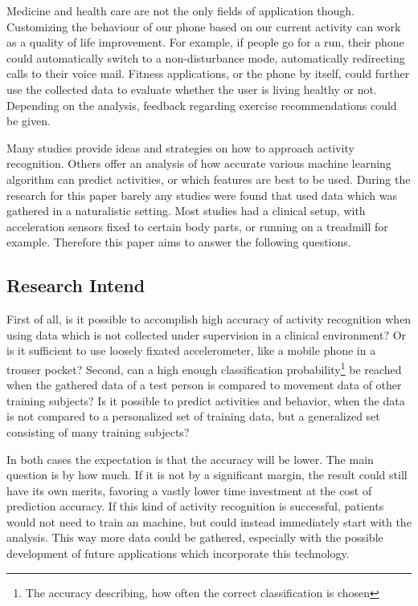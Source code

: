 Medicine and health care are not the only fields of application though. Customizing the behaviour of our phone based on our current activity can work as a quality of life improvement. For example, if people go for a run, their phone could automatically switch to a non-disturbance mode, automatically redirecting calls to their voice mail. Fitness applications, or the phone by itself, could further use the collected data to evaluate whether the user is living healthy or not. Depending on the analysis, feedback regarding exercise recommendations could be given. 

Many studies provide ideas and strategies on how to approach activity recognition. Others offer an analysis of how accurate various machine learning algorithm can predict activities, or which features are best to be used. During the research for this paper barely any studies were found that used data which was gathered in a naturalistic setting. Most studies had a clinical setup, with acceleration sensors fixed to certain body parts, or running on a treadmill for example. Therefore this paper aims to answer the following questions.


\subsection{Research Intend}
First of all, is it possible to accomplish high accuracy of activity recognition when using data which is not collected under supervision in a clinical environment? Or is it sufficient to use loosely fixated accelerometer, like a mobile phone in a trouser pocket? Second, can a high enough classification probability\footnote{The accuracy describing, how often the correct classification is chosen} be reached when the gathered data of a test person is compared to movement data of other training subjects? Is it possible to predict activities and behavior, when the data is not compared to a personalized set of training data, but a generalized set consisting of many training subjects?

In both cases the expectation is that the accuracy will be lower. The main question is by how much. If it is not by a significant margin, the result could still have its own merits, favoring a vastly lower time investment at the cost of prediction accuracy. If this kind of activity recognition is successful, patients would not need to train an machine, but could instead immediately start with the analysis. This way more data could be gathered, especially with the possible development of future applications which incorporate this technology.

